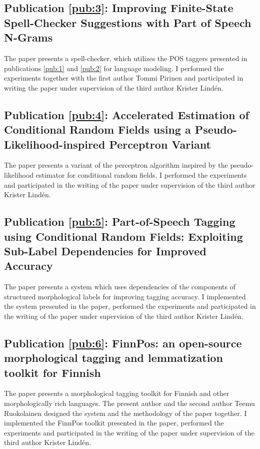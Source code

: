 \subsection*{\bf Publication \ref{pub:3}: Improving Finite-State Spell-Checker Suggestions with Part of Speech N-Grams}
\noindent The paper presents a spell-checker, which utilizes the POS
taggers presented in publications \ref{pub:1} and \ref{pub:2} for
language modeling. I performed the experiments together
with the first author Tommi Pirinen and participated in writing the
paper under supervision of the third author Krister Lind\'{e}n.

\subsection*{\bf Publication \ref{pub:4}: Accelerated Estimation of
  Conditional Random Fields using a Pseudo-Likelihood-inspired
  Perceptron Variant} The paper presents a variant of the perceptron
algorithm inspired by the pseudo-likelihood estimator for conditional
random fields. I performed the experiments and
participated in the writing of the paper under supervision of the
third author Krister Lind\'{e}n.


\subsection*{\bf Publication \ref{pub:5}: Part-of-Speech Tagging using
  Conditional Random Fields: Exploiting Sub-Label Dependencies for
  Improved Accuracy} The paper presents a system which uses
dependencies of the components of structured morphological labels
for improving tagging accuracy. I implemented the
system presented in the paper, performed the experiments and
participated in the writing of the paper under supervision of the
third author Krister Lind\'{e}n.


\subsection*{\bf Publication \ref{pub:6}: FinnPos: an open-source morphological tagging and lemmatization toolkit for Finnish} 
The paper presents a morphological tagging toolkit for Finnish and
other morphologically rich languages. The present author and the
second author Teemu Ruokolainen designed the system and the
methodology of the paper together. I implemented the
FinnPos toolkit presented in the paper, performed the experiments and
participated in the writing of the paper under supervision of the
third author Krister Lind\'{e}n.
